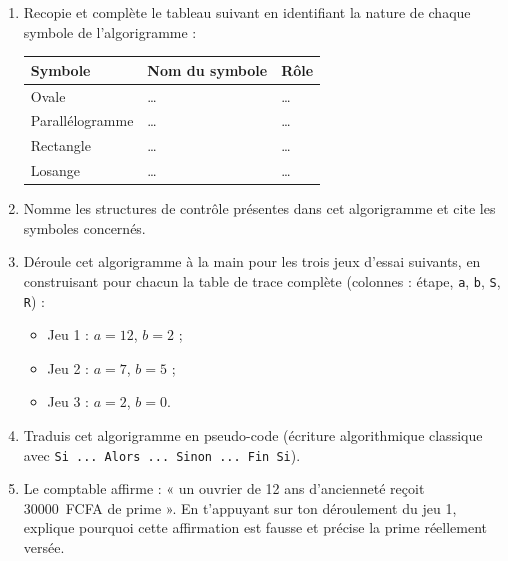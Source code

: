 \documentclass[11pt]{article}
\begin{document}
\begin{exercice}
\begin{enumerate}
\item Recopie et complète le tableau suivant en identifiant la nature de chaque symbole de l'algorigramme :
\begin{center}
\begin{tabularx}{\linewidth}{|l|X|X|}
\hline
\rowcolor{popblueL} \textbf{Symbole} & \textbf{Nom du symbole} & \textbf{Rôle} \\
\hline
Ovale & \ldots & \ldots \\
\hline
Parallélogramme & \ldots & \ldots \\
\hline
Rectangle & \ldots & \ldots \\
\hline
Losange & \ldots & \ldots \\
\hline
\end{tabularx}
\end{center}
\item Nomme les structures de contrôle présentes dans cet algorigramme et cite les symboles concernés.
\item Déroule cet algorigramme à la main pour les trois jeux d'essai suivants, en construisant pour chacun la table de trace complète (colonnes : étape, \texttt{a}, \texttt{b}, \texttt{S}, \texttt{R}) :
\begin{itemize}
\item Jeu 1 : $a = 12$, $b = 2$ ;
\item Jeu 2 : $a = 7$, $b = 5$ ;
\item Jeu 3 : $a = 2$, $b = 0$.
\end{itemize}
\item Traduis cet algorigramme en pseudo-code (écriture algorithmique classique avec \texttt{Si ... Alors ... Sinon ... Fin Si}).
\item Le comptable affirme : « un ouvrier de 12 ans d'ancienneté reçoit \SI{30000}{FCFA} de prime ». En t'appuyant sur ton déroulement du jeu 1, explique pourquoi cette affirmation est fausse et précise la prime réellement versée.
\end{enumerate}
\end{exercice}
\end{document}

